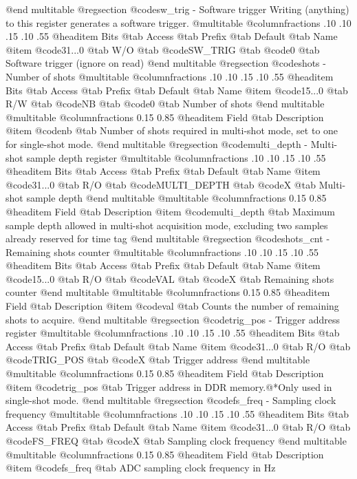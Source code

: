 @end multitable
@regsection @code{sw_trig} - Software trigger
Writing (anything) to this register generates a software trigger.
@multitable @columnfractions .10 .10 .15 .10 .55
@headitem Bits @tab Access @tab Prefix @tab Default @tab Name
@item @code{31...0}
@tab W/O @tab
@code{SW_TRIG}
@tab @code{0} @tab 
Software trigger (ignore on read)
@end multitable
@regsection @code{shots} - Number of shots
@multitable @columnfractions .10 .10 .15 .10 .55
@headitem Bits @tab Access @tab Prefix @tab Default @tab Name
@item @code{15...0}
@tab R/W @tab
@code{NB}
@tab @code{0} @tab 
Number of shots
@end multitable
@multitable @columnfractions 0.15 0.85
@headitem Field @tab Description
@item @code{nb} @tab Number of shots required in multi-shot mode, set to one for single-shot mode.
@end multitable
@regsection @code{multi_depth} - Multi-shot sample depth register
@multitable @columnfractions .10 .10 .15 .10 .55
@headitem Bits @tab Access @tab Prefix @tab Default @tab Name
@item @code{31...0}
@tab R/O @tab
@code{MULTI_DEPTH}
@tab @code{X} @tab 
Multi-shot sample depth
@end multitable
@multitable @columnfractions 0.15 0.85
@headitem Field @tab Description
@item @code{multi_depth} @tab Maximum sample depth allowed in multi-shot acquisition mode, excluding two samples already reserved for time tag
@end multitable
@regsection @code{shots_cnt} - Remaining shots counter
@multitable @columnfractions .10 .10 .15 .10 .55
@headitem Bits @tab Access @tab Prefix @tab Default @tab Name
@item @code{15...0}
@tab R/O @tab
@code{VAL}
@tab @code{X} @tab 
Remaining shots counter
@end multitable
@multitable @columnfractions 0.15 0.85
@headitem Field @tab Description
@item @code{val} @tab Counts the number of remaining shots to acquire.
@end multitable
@regsection @code{trig_pos} - Trigger address register
@multitable @columnfractions .10 .10 .15 .10 .55
@headitem Bits @tab Access @tab Prefix @tab Default @tab Name
@item @code{31...0}
@tab R/O @tab
@code{TRIG_POS}
@tab @code{X} @tab 
Trigger address
@end multitable
@multitable @columnfractions 0.15 0.85
@headitem Field @tab Description
@item @code{trig_pos} @tab Trigger address in DDR memory.@*Only used in single-shot mode.
@end multitable
@regsection @code{fs_freq} - Sampling clock frequency
@multitable @columnfractions .10 .10 .15 .10 .55
@headitem Bits @tab Access @tab Prefix @tab Default @tab Name
@item @code{31...0}
@tab R/O @tab
@code{FS_FREQ}
@tab @code{X} @tab 
Sampling clock frequency
@end multitable
@multitable @columnfractions 0.15 0.85
@headitem Field @tab Description
@item @code{fs_freq} @tab ADC sampling clock frequency in Hz
